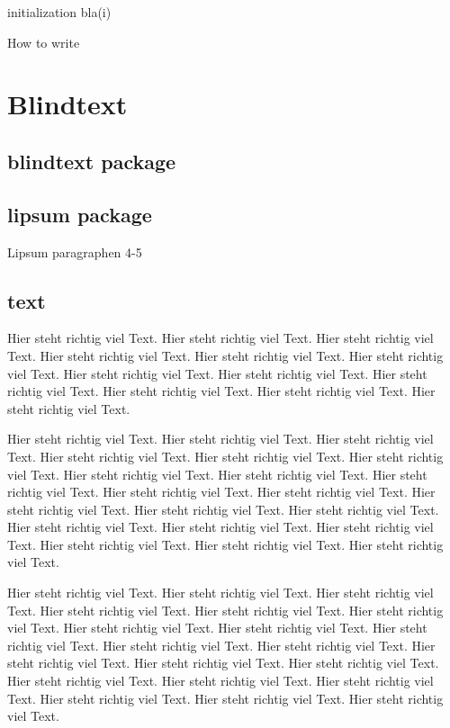 \begin{algorithm}[H]
    \SetAlgoLined
    initialization\;
     {
        bla(i)\;
    }
\caption{How to write }
\end{algorithm}


\section{Blindtext}

\subsection{blindtext package}
\blindtext[2]

\subsection{lipsum package}
Lipsum paragraphen 4-5 \\
\lipsum[4-5]

\subsection{text}

Hier steht richtig viel Text.
Hier steht richtig viel Text.
Hier steht richtig viel Text.
Hier steht richtig viel Text.
Hier steht richtig viel Text.
Hier steht richtig viel Text.
Hier steht richtig viel Text.
Hier steht richtig viel Text.
Hier steht richtig viel Text.
Hier steht richtig viel Text.
Hier steht richtig viel Text.
Hier steht richtig viel Text.

Hier steht richtig viel Text.
Hier steht richtig viel Text.
Hier steht richtig viel Text.
Hier steht richtig viel Text.
Hier steht richtig viel Text.
Hier steht richtig viel Text.
Hier steht richtig viel Text.
Hier steht richtig viel Text.
Hier steht richtig viel Text.
Hier steht richtig viel Text.
Hier steht richtig viel Text.
Hier steht richtig viel Text.
Hier steht richtig viel Text.
Hier steht richtig viel Text.
Hier steht richtig viel Text.
Hier steht richtig viel Text.
Hier steht richtig viel Text.
Hier steht richtig viel Text.
Hier steht richtig viel Text.
Hier steht richtig viel Text.

Hier steht richtig viel Text.
Hier steht richtig viel Text.
Hier steht richtig viel Text.
Hier steht richtig viel Text.
Hier steht richtig viel Text.
Hier steht richtig viel Text.
Hier steht richtig viel Text.
Hier steht richtig viel Text.
Hier steht richtig viel Text.
Hier steht richtig viel Text.
Hier steht richtig viel Text.
Hier steht richtig viel Text.
Hier steht richtig viel Text.
Hier steht richtig viel Text.
Hier steht richtig viel Text.
Hier steht richtig viel Text.
Hier steht richtig viel Text.
Hier steht richtig viel Text.
Hier steht richtig viel Text.
Hier steht richtig viel Text.


